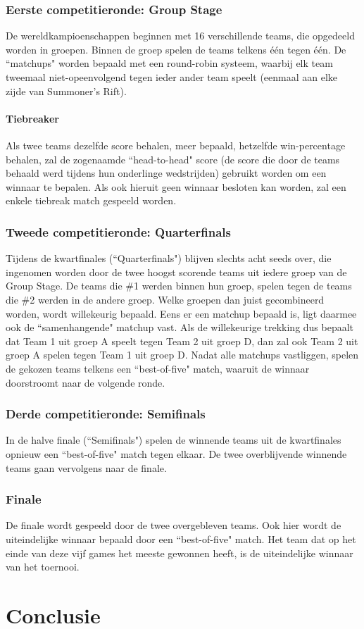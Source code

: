 \documentclass[12pt,a4paper]{article}
\begin{document}
			\subsubsection{Eerste competitieronde: Group Stage}
				De wereldkampioenschappen beginnen met 16 verschillende teams, die opgedeeld worden in groepen. Binnen de groep spelen de teams telkens één tegen één. De ``matchups" worden bepaald met een round-robin systeem, waarbij elk team tweemaal niet-opeenvolgend tegen ieder ander team speelt (eenmaal aan elke zijde van Summoner's Rift).
				\paragraph{Tiebreaker}
				Als twee teams dezelfde score behalen, meer bepaald, hetzelfde win-percentage behalen, zal de zogenaamde ``head-to-head" score (de score die door de teams behaald werd tijdens hun onderlinge wedstrijden) gebruikt worden om een winnaar te bepalen. Als ook hieruit geen winnaar besloten kan worden, zal een enkele tiebreak match gespeeld worden.
			\subsubsection{Tweede competitieronde: Quarterfinals}
				Tijdens de kwartfinales (``Quarterfinals") blijven slechts acht seeds over, die ingenomen worden door de twee hoogst scorende teams uit iedere groep van de Group Stage. De teams die \#1 werden binnen hun groep, spelen tegen de teams die \#2 werden in de andere groep. Welke groepen dan juist gecombineerd worden, wordt willekeurig bepaald. Eens er een matchup bepaald is, ligt daarmee ook de ``samenhangende" matchup vast. Als de willekeurige trekking dus bepaalt dat Team 1 uit groep A speelt tegen Team 2 uit groep D, dan zal ook Team 2 uit groep A spelen tegen Team 1 uit groep D. Nadat alle matchups vastliggen, spelen de gekozen teams telkens een ``best-of-five" match, waaruit de winnaar doorstroomt naar de volgende ronde.
			\subsubsection{Derde competitieronde: Semifinals}
				In de halve finale (``Semifinals") spelen de winnende teams uit de kwartfinales opnieuw een ``best-of-five" match tegen elkaar. De twee overblijvende winnende teams gaan vervolgens naar de finale.
			\subsubsection{Finale}
				De finale wordt gespeeld door de twee overgebleven teams. Ook hier wordt de uiteindelijke winnaar bepaald door een ``best-of-five" match. Het team dat op het einde van deze vijf games het meeste gewonnen heeft, is de uiteindelijke winnaar van het toernooi.
	\section{Conclusie}
\end{document}
